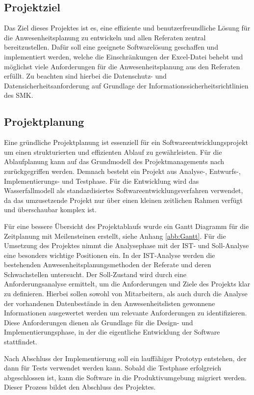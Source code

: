 \subsection{Projektziel}
\label{sec:Projektziel}

Das Ziel dieses Projektes ist es, eine effiziente und benutzerfreundliche Lösung für die Anwesenheitsplanung zu entwickeln und allen Referaten zentral bereitzustellen. Dafür soll eine geeignete Softwarelösung geschaffen und implementiert werden, welche die Einschränkungen der Excel-Datei behebt und möglichst viele Anforderungen für die Anwesenheitsplanung aus den Referaten erfüllt. Zu beachten sind hierbei die Datenschutz- und Datensicherheitsanforderung auf Grundlage der Informationssicherheitsrichtlinien des SMK.

\subsection{Projektplanung}
\label{sec:Projektplanung}

Eine gründliche Projektplanung ist essenziell für ein Softwareentwicklungsprojekt um einen strukturierten und effizienten Ablauf zu gewährleisten. Für die Ablaufplanung kann auf das Grundmodell des Projektmanagements nach \cite[S.225]{dehler-2013} zurückgegriffen werden. Demnach besteht ein Projekt aus Analyse-, Entwurfs-, Implementierungs- und Testphase. Für die Entwicklung wird das Wasserfallmodell als standardisiertes Softwareentwicklungsverfahren verwendet, da das umzusetzende Projekt nur über einen kleinen zeitlichen Rahmen verfügt und überschaubar komplex ist.

Für eine bessere Übersicht des Projektablaufs wurde ein Gantt Diagramm für die Zeitplanung mit Meilensteinen erstellt, siehe Anhang \ref{abb:Gantt}. Für die Umsetzung des Projektes nimmt die Analysephase mit der IST- und Soll-Analyse eine besonders wichtige Positionen ein. In der IST-Analyse werden die bestehenden Anwesenheitsplanungsmethoden der Referate und deren Schwachstellen untersucht. Der Soll-Zustand wird durch eine Anforderungsanalyse ermittelt, um die Anforderungen und Ziele des Projekts klar zu definieren. Hierbei sollen sowohl von Mitarbeitern, als auch durch die Analyse der vorhandenen Datenbestände in den Anwesenheitslisten gewonnene Informationen ausgewertet werden um relevante Anforderungen zu identifizieren. Diese Anforderungen dienen als Grundlage für die Design- und Implementierungsphase, in der die eigentliche Entwicklung der Software stattfindet.

Nach Abschluss der Implementierung soll ein lauffähiger Prototyp entstehen, der dann für Tests verwendet werden kann. Sobald die Testphase erfolgreich abgeschlossen ist, kann die Software in die Produktivumgebung migriert werden. Dieser Prozess bildet den Abschluss des Projektes.


